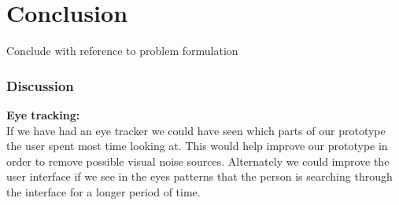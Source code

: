 \chapter{Conclusion}

Conclude with reference to problem formulation

\subsection{Discussion}
\textbf{Eye tracking:}\\
If we have had an eye tracker we could have seen which parts of our prototype the user spent most time looking at. This would help improve our prototype in order to remove possible visual noise sources. Alternately we could improve the user interface if we see in the eyes patterns that the person is searching through the interface for a longer period of time. 